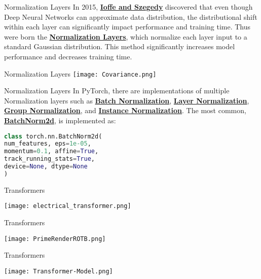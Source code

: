 \documentclass{beamer}
\begin{document}
\begin{frame}[fragile]{Normalization Layers}
    In 2015, \href{https://arxiv.org/abs/1502.03167}{\textbf{Ioffe and Szegedy}} discovered that even though Deep Neural Networks can approximate data distribution, the distributional shift within each layer can significantly impact performance and training time. Thus were born the \href{https://pytorch.org/docs/stable/nn.html#normalization-layers}{\textbf{Normalization Layers}}, which normalize each layer input to a standard Gaussian distribution. This method significantly increases model performance and decreases training time.
\end{frame}
\begin{frame}[fragile]{Normalization Layers}
    \centering\texttt{[image: Covariance.png]}
\end{frame}
\begin{frame}[fragile]{Normalization Layers}
    In PyTorch, there are implementations of multiple Normalization layers such as \href{https://arxiv.org/abs/1502.03167}{\textbf{Batch Normalization}}, \href{https://arxiv.org/abs/1607.06450}{\textbf{Layer Normalization}}, \href{https://arxiv.org/abs/1803.08494}{\textbf{Group Normalization}}, and \href{https://arxiv.org/abs/1701.02096}{\textbf{Instance Normalization}}. The most common, \href{https://pytorch.org/docs/stable/generated/torch.nn.BatchNorm2d.html}{\textbf{BatchNorm2d}}, is implemented as:
    \begin{exampleblock}{}
        \begin{lstlisting}[language=Python]
class torch.nn.BatchNorm2d(
num_features, eps=1e-05,
momentum=0.1, affine=True,
track_running_stats=True,
device=None, dtype=None
)
        \end{lstlisting}
    \end{exampleblock}
\end{frame}

\begin{frame}[fragile]{Transformers}
    \begin{center}
        \texttt{[image: electrical\_transformer.png]}
    \end{center}
\end{frame}

\begin{frame}[fragile]{Transformers}
    \begin{center}
        \texttt{[image: PrimeRenderROTB.png]}
    \end{center}
\end{frame}
\begin{frame}[fragile]{Transformers}
    \begin{center}
        \texttt{[image: Transformer-Model.png]}
    \end{center}
\end{frame}
\end{document}
